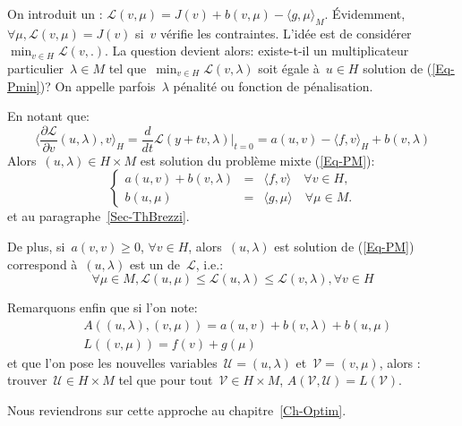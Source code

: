 \medskip
On introduit un :
$\mathscr{L}(v,\mu) = J(v)+b(v,\mu) - \langle g,\mu\rangle_M$.
Évidemment, $\forall\mu, \mathscr{L}(v,\mu)=J(v)$ si~$v$ vérifie les contraintes.
L'idée est de considérer~$\min_{v\in H} \mathscr{L}(v,.)$.
La question devient alors: existe-t-il un multiplicateur particulier~$\lambda\in M$ tel que~$\min_{v\in H} \mathscr{L}(v,\lambda)$ soit égale à~$u\in H$ solution de (\ref{Eq-Pmin})?
On appelle parfois~$\lambda$ pénalité ou fonction de pénalisation.

\medskip
En notant que:
\begin{equation}\langle\frac{\partial\mathscr{L}}{\partial v}(u,\lambda),v\rangle_H
=\frac d{dt}\mathscr{L}(y+tv,\lambda)|_{t=0}
=a(u,v)-\langle f,v\rangle_H+b(v,\lambda)
\end{equation}
Alors~$(u,\lambda) \in H\times M$ est solution du problème mixte (\ref{Eq-PM}):
 \begin{equation}\left\{
\begin{array}{rcl}
 a(u,v) + b(v, \lambda) &=& \langle f,v\rangle \quad \forall v\in H,\\
b(u,\mu) &=& \langle g,\mu\rangle \quad \forall \mu \in M.
\end{array}\right.
\end{equation}
et  au paragraphe~\ref{Sec-ThBrezzi}.

\medskip
De plus, si~$a(v,v)\ge 0$, $\forall v\in H$, alors~$(u,\lambda)$ est solution de (\ref{Eq-PM}) correspond à~$(u,\lambda)$ est un  de~$\mathscr{L}$, i.e.:
\begin{equation}
\forall\mu\in M, \mathscr{L}(u,\mu) \le \mathscr{L}(u,\lambda) \le
\mathscr{L}(v,\lambda), \forall v\in H
\end{equation}

\medskip
Remarquons enfin que si l'on note:
\begin{align}&A((u,\lambda),(v,\mu))=a(u,v)+b(v,\lambda)+b(u,\mu)\\
&L((v,\mu))=f(v)+g(\mu)\end{align}
et que l'on pose les nouvelles variables~$\mathscr{U}=(u,\lambda)$ et~$\mathscr{V}=(v,\mu)$, alors : trouver~$\mathscr{U}\in H\times M$
tel que pour tout~$\mathscr{V}\in H\times M$, $A(\mathscr{V},\mathscr{U})=L(\mathscr{V})$.

Nous reviendrons sur cette approche au chapitre~\ref{Ch-Optim}.

